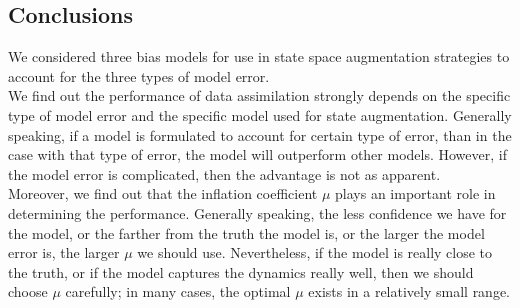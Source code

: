 \documentclass[twocolumn]{article}
\begin{document}
\subsection{Conclusions}
We considered three bias models for use in state space augmentation strategies to account for the three types of model error.\\
We find out the performance of data assimilation strongly depends on the specific type of model error and the specific model used for state augmentation. Generally speaking, if a model is formulated to account for certain type of error, than in the case with that type of error, the model will outperform other models. However, if the model error is complicated, then the advantage is not as apparent.\\
Moreover, we find out that the inflation coefficient $\mu$ plays an important role in determining the performance. Generally speaking, the less confidence we have for the model, or the farther from the truth the model is, or the larger the model error is, the larger $\mu$ we should use. Nevertheless, if the model is really close to the truth, or if the model captures the dynamics really well, then we should choose $\mu$ carefully; in many cases, the optimal $\mu$ exists in a relatively small range.
\end{document}
